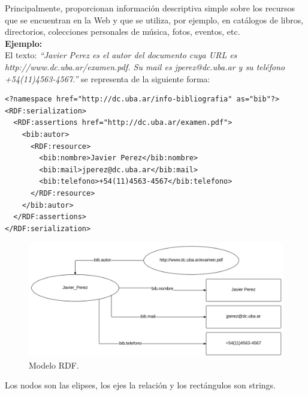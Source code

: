 \documentclass[10pt,a4paper]{article}
\begin{document}
Principalmente, proporcionan información descriptiva simple sobre los recursos que se encuentran en la Web y que se utiliza, por ejemplo, en catálogos de libros, directorios, colecciones personales de música, fotos, eventos, etc.\\

\textbf{Ejemplo:}\\
\newline
El texto: \textit{``Javier Perez es el autor del documento cuya URL es http://www.dc.uba.ar/examen.pdf. Su mail es jperez@dc.uba.ar y su teléfono +54(11)4563-4567.''} se representa de la siguiente forma:
\begin{verbatim}
<?namespace href="http://dc.uba.ar/info-bibliografia" as="bib"?> 
<RDF:serialization> 
  <RDF:assertions href="http://dc.uba.ar/examen.pdf"> 
    <bib:autor> 
      <RDF:resource> 
        <bib:nombre>Javier Perez</bib:nombre> 
        <bib:mail>jperez@dc.uba.ar</bib:mail> 
        <bib:telefono>+54(11)4563-4567</bib:telefono> 
      </RDF:resource> 
    </bib:autor> 
  </RDF:assertions> 
</RDF:serialization>
\end{verbatim}

\begin{center}
\begin{figure}[H] %
\includegraphics[width=400pt]{./imgs/rdfModel.png}
\caption{Modelo RDF.}
\end{figure}
Los nodos son las elipses, los ejes la relación y los rectángulos son strings.
\end{center}
\end{document}
